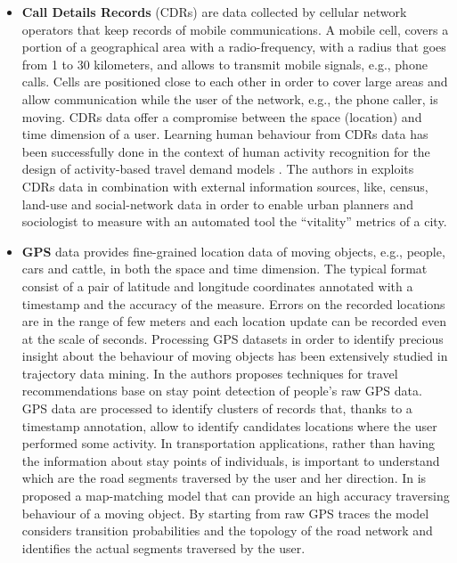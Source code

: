 \begin{itemize}
	\item \textbf{Call Details Records} (CDRs) are data collected by cellular network operators that keep records of mobile communications. A mobile cell, covers a portion of a geographical area with a radio-frequency, with a radius that goes from 1 to 30 kilometers, and allows to transmit mobile signals, e.g., phone calls. 
	Cells are positioned close to each other in order to cover large areas and allow communication while the user of the network, e.g., the phone caller, is moving. CDRs data offer a compromise between the space (location) and time dimension of a user. 
	Learning human behaviour from CDRs data has been successfully done in the context of human activity recognition for the design of activity-based travel demand models \cite{cdr:urban:humanActivita:HMM:Feygin:2018}. The authors in \cite{cdr:urban:jacobsMetrics:quercia:2016} exploits CDRs data in combination with external information sources, like, census, land-use and social-network data in order to enable urban planners and sociologist to measure with an automated tool the ``vitality'' metrics of a city.
	
	\item \textbf{GPS} data provides fine-grained location data of moving objects, e.g., people, cars and cattle, in both the space and time dimension. The typical format consist of a pair of latitude and longitude coordinates annotated with a timestamp and the accuracy of the measure. Errors on the recorded locations are in the range of few meters and each location update can be recorded even at the scale of seconds.
	Processing GPS datasets in order to identify precious insight about the behaviour of moving objects has been extensively studied in trajectory data mining. In \cite{gps:geolife} the authors proposes techniques for travel recommendations base on stay point detection of people's raw GPS data. GPS data are processed to identify clusters of records that, thanks to a timestamp annotation, allow to identify candidates locations where the user performed some activity. In transportation applications, rather than having the information about stay points of individuals, is important to understand which are the road segments traversed by the user and her direction. In \cite{gps:mapmatching:HMM} is proposed a map-matching model that can provide an high accuracy traversing behaviour of a moving object. By starting from raw GPS traces the model considers transition probabilities and the topology of the road network and identifies the actual segments traversed by the user.
	

\end{itemize}
